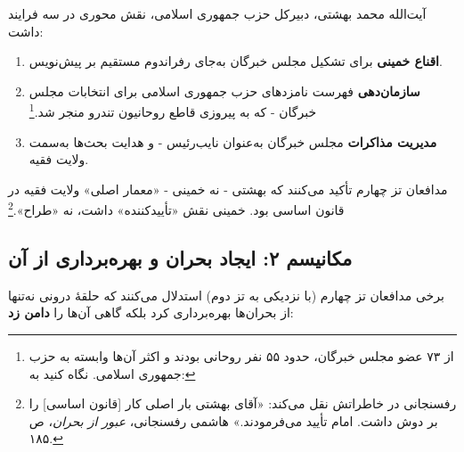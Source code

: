 \documentclass[12pt,a4paper]{book}
\newcommand{\keyword}[1]{\textbf{\textcolor{cPrimary}{#1}}}
\newcommand{\en}[1]{\lr{\textit{#1}}}
\begin{document}
\begin{warningBox}
آیت‌الله محمد بهشتی، دبیرکل حزب جمهوری اسلامی، نقش محوری در سه فرایند داشت:

\begin{enumerate}[label=\textcolor{cAccent}{\bfseries\arabic*.}, rightmargin=2em]
    \item \textbf{اقناع خمینی} برای تشکیل مجلس خبرگان به‌جای رفراندوم مستقیم بر پیش‌نویس.
    \item \textbf{سازمان‌دهی} فهرست نامزدهای حزب جمهوری اسلامی برای انتخابات مجلس خبرگان - که به پیروزی قاطع روحانیون تندرو منجر شد.\footnote{از ۷۳ عضو مجلس خبرگان، حدود ۵۵ نفر روحانی بودند و اکثر آن‌ها وابسته به حزب جمهوری اسلامی. نگاه کنید به: \en{Schirazi (1997), pp.\,30--38.}}
    \item \textbf{مدیریت مذاکرات} مجلس خبرگان به‌عنوان نایب‌رئیس - و هدایت بحث‌ها به‌سمت ولایت فقیه.
\end{enumerate}
\end{warningBox}

مدافعان تز چهارم تأکید می‌کنند که بهشتی - نه خمینی - «معمار اصلی» ولایت فقیه در قانون اساسی بود. خمینی نقش «تأییدکننده» داشت، نه «طراح».\footnote{رفسنجانی در خاطراتش نقل می‌کند: «آقای بهشتی بار اصلی کار [قانون اساسی] را بر دوش داشت. امام تأیید می‌فرمودند.» هاشمی رفسنجانی، \textit{عبور از بحران}، ص ۱۸۵.}

\subsection{مکانیسم ۲: ایجاد بحران و بهره‌برداری از آن}

برخی مدافعان تز چهارم (با نزدیکی به تز دوم) استدلال می‌کنند که حلقهٔ درونی نه‌تنها از بحران‌ها بهره‌برداری کرد بلکه گاهی آن‌ها را \keyword{دامن زد}:
\end{document}
